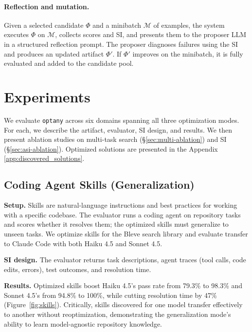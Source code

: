 \documentclass[sigconf,anonymous,review]{acmart}
\newcommand{\oa}{\texttt{optany}}
\newcommand{\asi}{SI}
\begin{document}
\paragraph{Reflection and mutation.} Given a selected candidate $\Phi$ and a minibatch $\mathcal{M}$ of examples, the system executes $\Phi$ on $\mathcal{M}$, collects scores and \asi{}, and presents them to the proposer LLM in a structured reflection prompt. The proposer diagnoses failures using the \asi{} and produces an updated artifact $\Phi'$. If $\Phi'$ improves on the minibatch, it is fully evaluated and added to the candidate pool.


\section{Experiments}\label{sec:experiments}

We evaluate \oa{} across six domains spanning all three optimization modes. For each, we describe the artifact, evaluator, \asi{} design, and results. We then present ablation studies on multi-task search (\S\ref{sec:multi-ablation}) and \asi{} (\S\ref{sec:asi-ablation}).
Optimized solutions are presented in the Appendix \ref{app:discovered_solutions}.

\subsection{Coding Agent Skills (Generalization)}\label{sec:skills}

\textbf{Setup.} Skills are natural-language instructions and best practices for working with a specific codebase. The evaluator runs a coding agent on repository tasks and scores whether it resolves them; the optimized skills must generalize to unseen tasks. We optimize skills for the Bleve search library and evaluate transfer to Claude Code with both Haiku 4.5 and Sonnet 4.5.

\textbf{\asi{} design.} The evaluator returns task descriptions, agent traces (tool calls, code edits, errors), test outcomes, and resolution time.

\textbf{Results.} Optimized skills boost Haiku 4.5's pass rate from 79.3\% to 98.3\% and Sonnet 4.5's from 94.8\% to 100\%, while cutting resolution time by 47\% (Figure~\ref{fig:skills}). Critically, skills discovered for one model transfer effectively to another without reoptimization, demonstrating the generalization mode's ability to learn model-agnostic repository knowledge.
\end{document}
